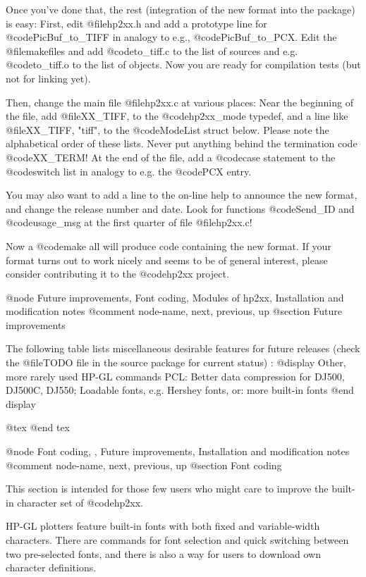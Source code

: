 Once you've done that, the rest (integration of the new format into the
package) is easy: First, edit @file{hp2xx.h} and add a prototype
line for @code{PicBuf_to_TIFF} in analogy to e.g., @code{PicBuf_to_PCX}.
Edit the @file{makefile}s and add @code{to_tiff.c} to the list of sources
and e.g. @code{to_tiff.o} to the list of objects. Now you are ready for
compilation tests (but not for linking yet).

Then, change the main file @file{hp2xx.c} at various places: Near the
beginning of the file, add @file{XX_TIFF, } to the @code{hp2xx_mode} typedef,
and a line like @file{XX_TIFF,   "tiff", } to the @code{ModeList} struct below.
Please note the alphabetical order of these lists. Never put anything behind
the termination code @code{XX_TERM}! At the end of the file,
add a @code{case} statement to the @code{switch} list in analogy to e.g.
the @code{PCX} entry.

You may also want to add a line to the on-line help to
announce the new format, and change the release number and date.
Look for functions @code{Send_ID} and @code{usage_msg} at the first quarter
of file @file{hp2xx.c}!

Now a @code{make all} will produce code containing the new format.
If your format turns out to work nicely and seems to be of general interest,
please consider contributing it to the @code{hp2xx} project.



@node Future improvements, Font coding, Modules of hp2xx, Installation and modification notes
@comment  node-name,  next,  previous,  up
@section Future improvements

The following table lists miscellaneous desirable features for future
releases (check the @file{TODO} file in the source package for current
status) :
@display
  Other, more rarely used HP-GL commands
  PCL: Better data compression for DJ500, DJ500C, DJ550;
  Loadable fonts, e.g. Hershey fonts, or: more built-in fonts
@end display

@tex
\page
@end tex

@node Font coding, , Future improvements, Installation and modification notes
@comment  node-name,  next,  previous,  up
@section Font coding

This section is intended for those few users who might care to
improve the built-in character set of @code{hp2xx}.

HP-GL plotters feature built-in fonts with both fixed and
variable-width characters. There are commands for font selection
and quick switching between two pre-selected fonts, and there
is also a way for users to download own character definitions.

